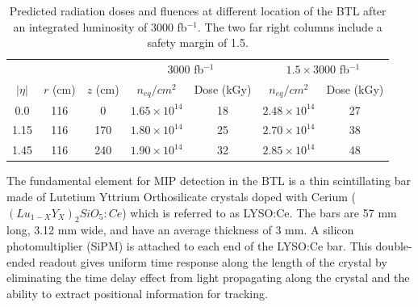  \begin{table}[h]
 	\centering
 	\caption{Predicted radiation doses and fluences at different location of the BTL after an integrated luminosity of 3000 fb$^{-1}$.  The two far right columns include a safety margin of 1.5.}
 	\begin{tabular}{|c|c|c|c|c|c|c|}
 		\hline
 		& & & \multicolumn{2}{|c|}{3000 fb$^{-1}$}  & \multicolumn{2}{|c|}{$1.5\times 3000$ fb$^{-1}$}  \\
 		$|\eta|$ & $r$ (cm) & $z$ (cm) & $n_{eq}/cm^2$ & Dose (kGy) & $n_{eq}/cm^2$ & Dose (kGy) \\
 		\hline
 		\hline
 		0.0 & 116 & 0 & $1.65\times10^{14}$ & 18 & $2.48\times10^{14}$ & 27 \\
 		\hline
 		1.15 & 116 & 170 & $1.80\times10^{14}$ & 25 & $2.70\times10^{14}$ & 38 \\
 		\hline
 		1.45 & 116 & 240 & $1.90\times10^{14}$ & 32 & $2.85\times10^{14}$ & 48 \\
 		\hline
 	\end{tabular}
 \label{table:fluences}
\end{table}
 The fundamental element for MIP detection in the BTL is a thin scintillating bar made of Lutetium Yttrium Orthosilicate crystals doped with Cerium ($(Lu_{1-X}Y_X)_2SiO_5:Ce$) which is referred to as LYSO:Ce.  The bars are 57 mm long, 3.12 mm wide, and have an average thickness of 3 mm.  A silicon photomultiplier (SiPM) is attached to each end of the LYSO:Ce bar.  This double-ended readout gives uniform time response along the length of the crystal by eliminating the time delay effect from light propagating along the crystal and the ability to extract positional information for tracking. 
 
